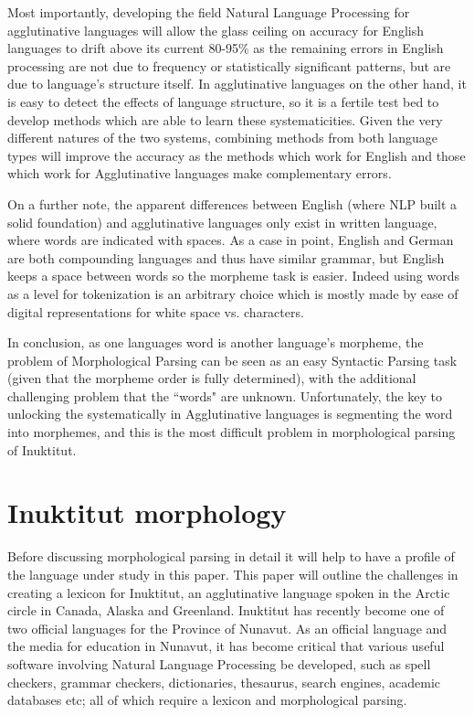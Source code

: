 \documentclass[runningheads,a4paper]{llncs}
\begin{document}
Most importantly, developing the field Natural Language Processing for agglutinative languages will allow the glass ceiling on accuracy for English languages to drift above its current 80-95\% as the remaining errors in English processing are not due to frequency or statistically significant patterns, but are due to language's structure itself. In agglutinative languages on the other hand, it is easy to detect the effects of language structure, so it is a fertile test bed to develop methods which are able to learn these systematicities. Given the very different natures of the two systems, combining methods from both language types will improve the accuracy as the methods which work for English and those which work for Agglutinative languages make complementary errors. 

On a further note, the apparent differences between English (where NLP built a solid foundation) and agglutinative languages only exist in written language, where words are indicated with spaces. As a case in point, English and German are both compounding languages and thus have similar grammar, but English keeps a space between words so the morpheme task is easier. Indeed using words as a level for tokenization is an arbitrary choice which is mostly made by ease of digital representations for white space vs. characters.


In conclusion, as one languages word is another language's morpheme, the problem of Morphological Parsing can be seen as an easy Syntactic Parsing task (given that the morpheme order is fully determined), with the additional challenging problem that the ``words" are unknown. Unfortunately, the key to unlocking the systematically in Agglutinative languages is segmenting the word into morphemes, and this is the most difficult problem in morphological parsing of Inuktitut.

\section{Inuktitut morphology}
\label{inuktitut}

Before discussing morphological parsing in detail it will help to have a profile of the language under study in this paper. This paper will outline the challenges in creating a lexicon for Inuktitut, an agglutinative language spoken in the Arctic circle in Canada, Alaska and Greenland. Inuktitut has recently become one of two official languages for the Province of Nunavut. As an official language and the media for education in Nunavut, it has become critical that various useful software involving Natural Language Processing be developed, such as spell checkers, grammar checkers, dictionaries, thesaurus, search engines, academic databases etc; all of which require a lexicon and morphological parsing. 
\end{document}
